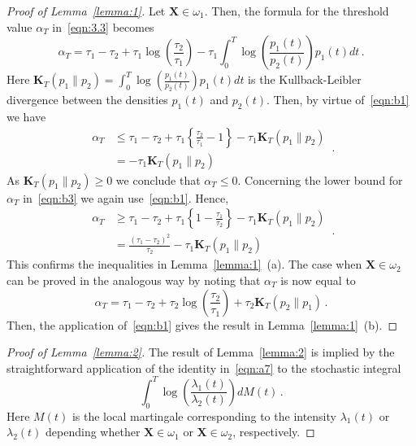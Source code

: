 \documentclass[lettersize,journal,onecolumn]{IEEEtran}
\theoremstyle{definition}
\begin{document}
\begin{proof}[Proof of Lemma~\ref{lemma:1}]
	Let $\mathbf{X}\in\omega_{1}$. Then, the formula for the threshold value 
	$\alpha_{T}$ in~\eqref{eqn:3.3} becomes
	\begin{equation}
		\alpha_{T} = 
		\tau_{1} - \tau_{2} + \tau_{1}\log\left(\frac{\tau_{2}}{\tau_{1}}\right) -
		\tau_{1}\int_{0}^{T}\log\left(\frac{p_{1}(t)}{p_{2}(t)}\right)p_{1}(t)dt
		\label{eqn:b3}\,.
	\end{equation}
	Here \mbox{$
		\mathbf{K}_{T}\left(p_{1}\parallel p_{2}\right) =
		\int_{0}^{T}\log\left(\frac{p_{1}(t)}{p_{2}(t)}\right)p_{1}(t)dt
		$} is the Kullback-Leibler divergence between the densities $p_{1}(t)$ and $p_{2}(t)$. 
	Then, by virtue of~\eqref{eqn:b1} we have
	\begin{equation*}
		\begin{split}
			\alpha_{T} & \leq
			\tau_{1} - \tau_{2} + \tau_{1}\left\{\frac{\tau_{2}}{\tau_{1}}-1\right\}-
			\tau_{1}\mathbf{K}_T(p_{1} \parallel p_{2}) \\
			& = -\tau_{1}\mathbf{K}_T(p_{1} \parallel p_{2})
		\end{split}
		\,.
	\end{equation*}
	As $\mathbf{K}_T(p_{1} \parallel p_{2})\geq0$ we conclude that $\alpha_{T}\leq0$. 
	Concerning the lower bound for $\alpha_{T}$ in~\eqref{eqn:b3} we again 
	use~\eqref{eqn:b1}. Hence,
	\begin{equation*}
		\begin{split}
			\alpha_{T} & \geq
			\tau_{1} - \tau_{2} + \tau_{1}\left\{1-\frac{\tau_{1}}{\tau_{2}}\right\}-
			\tau_{1}\mathbf{K}_T(p_{1} \parallel p_{2}) \\
			& = \frac{\left(\tau_{1}-\tau_{2}\right)^2}{\tau_{2}}-
			\tau_{1}\mathbf{K}_T(p_{1} \parallel p_{2})
		\end{split}
		\,.
	\end{equation*}
	This confirms the inequalities in Lemma~\ref{lemma:1}~(a). The case when 
	$\mathbf{X}\in\omega_{2}$ can be proved in 	the analogous way by noting that 
	$\alpha_{T}$ is now equal to
	\begin{equation*}
		\alpha_{T}=
		\tau_{1} - \tau_{2} + \tau_{2}
		\log\left(\frac{\tau_{2}}{\tau_{1}}\right)+
		\tau_{2}\mathbf{K}_T(p_{2} \parallel p_{1})
		\,.
	\end{equation*}
	Then, the application of~\eqref{eqn:b1} gives the result in Lemma~\ref{lemma:1}~(b).
\end{proof}

\begin{proof}[Proof of Lemma~\ref{lemma:2}]
	The result of Lemma~\ref{lemma:2} is implied by the straightforward application of 
	the identity in~\eqref{eqn:a7} to the stochastic integral
	\begin{equation*}
		\int_{0}^{T}\log\left(\frac{\lambda_{1}(t)}{\lambda_{2}(t)}\right)dM(t)
		\,.
	\end{equation*}
	Here $M(t)$ is the local martingale corresponding to the intensity 
	$\lambda_{1}(t)$ or $\lambda_{2}(t)$ depending whether $\mathbf{X}\in\omega_{1}$ 
	or $\mathbf{X}\in\omega_{2}$, respectively.
\end{proof}
\end{document}
